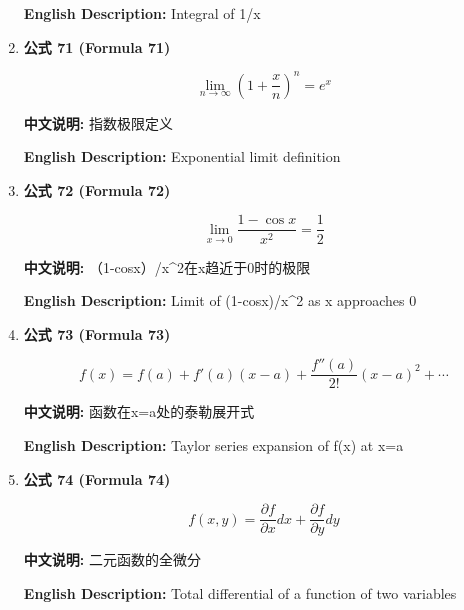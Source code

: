 \documentclass[12pt,a4paper]{article}
\begin{document}
\begin{enumerate}[leftmargin=*]
\textbf{English Description:} Integral of 1/x

\vspace{0.5cm}

\item \textbf{公式 71 (Formula 71)}

\begin{equation}
\lim_{n \to \infty}\left(1+\frac{x}{n}\right)^n = e^x
\end{equation}

\textbf{中文说明:} 指数极限定义

\textbf{English Description:} Exponential limit definition

\vspace{0.5cm}

\item \textbf{公式 72 (Formula 72)}

\begin{equation}
\lim_{x \to 0} \frac{1-\cos x}{x^2} = \frac{1}{2}
\end{equation}

\textbf{中文说明:} （1-cosx）/x\textasciicircum{}2在x趋近于0时的极限

\textbf{English Description:} Limit of (1-cosx)/x\textasciicircum{}2 as x approaches 0

\vspace{0.5cm}

\item \textbf{公式 73 (Formula 73)}

\begin{equation}
f(x) = f(a) + f'(a)(x-a) + \frac{f''(a)}{2!}(x-a)^2 + \cdots
\end{equation}

\textbf{中文说明:} 函数在x=a处的泰勒展开式

\textbf{English Description:} Taylor series expansion of f(x) at x=a

\vspace{0.5cm}

\item \textbf{公式 74 (Formula 74)}

\begin{equation}
f(x, y) = \frac{\partial f}{\partial x} dx + \frac{\partial f}{\partial y} dy
\end{equation}

\textbf{中文说明:} 二元函数的全微分

\textbf{English Description:} Total differential of a function of two variables

\vspace{0.5cm}


\end{enumerate}
\end{document}
